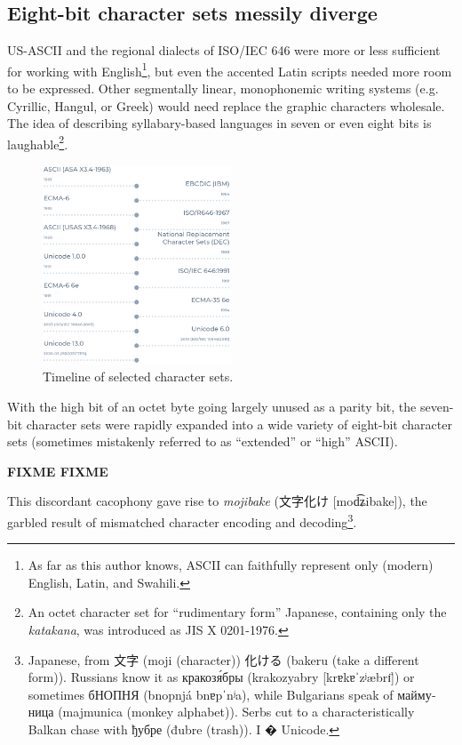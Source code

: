 \documentclass[letterpaper,10pt]{article}
\begin{document}
\subsection{Eight-bit character sets messily diverge}
US-ASCII and the regional dialects of ISO/IEC 646 were more or less sufficient
for working with English\footnote{As far as this author knows, ASCII
can faithfully represent only (modern) English, Latin, and Swahili.}, but even
the accented Latin scripts needed more room to be expressed. Other
segmentally linear, monophonemic writing systems (e.g. Cyrillic, Hangul, or
Greek) would need replace the graphic characters wholesale. The idea of
describing syllabary-based languages in seven or even eight bits is
laughable\footnote{An octet character set for ``rudimentary form'' Japanese,
containing only the \textit{katakana}, was introduced as JIS X 0201-1976.}.

\begin{figure}
\centering
\includegraphics[width=0.5\textwidth]{media/charset-timeline.png}
\caption{Timeline of selected character sets.}
\label{fig:charset-timeline}
\end{figure}

With the high bit of an octet byte going largely unused as a parity bit, the
seven-bit character sets were rapidly expanded into a wide variety of eight-bit
character sets (sometimes mistakenly referred to as ``extended'' or ``high'' ASCII).

\textbf{FIXME FIXME}

This discordant cacophony gave rise to \textit{mojibake} (文字化け [{mod͡ʑibake}]),
the garbled result of mismatched character encoding and decoding\footnote{Japanese, from 文字 (moji (character))
化ける (bakeru (take a different form)). Russians know it as \textrussian{кракозя́бры}
(krakozyabry [{krɐkɐˈzʲæbrɪ̈}]) or sometimes
\textrussian{бНОПНЯ} (bnopnjá {bnɐpˈnʲa}), while
Bulgarians speak of \textbulgarian{маймуница} (majmunica (monkey alphabet)).
Serbs cut to a characteristically Balkan chase with \textrussian{ђубре} (đubre
(trash)). I {�} Unicode.}.
\end{document}
